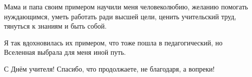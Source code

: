 Мама и папа своим примером научили меня человеколюбию, желанию помогать
нуждающимся, уметь работать ради высшей цели, ценить учительский труд, тянуться
к знаниям и быть собой.

Я так вдохновилась их примером, что тоже пошла в педагогический, но Вселенная
выбрала для меня иной путь. 

С Днём учителя! Спасибо, что продолжаете, не благодаря, а вопреки!
